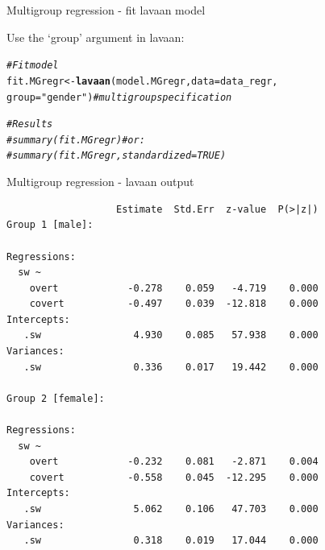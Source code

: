 \documentclass[10pt]{beamer}\usepackage[]{graphicx}\usepackage[]{xcolor}
\makeatletter
\newcommand{\hlstr}[1]{\textcolor[rgb]{0.192,0.494,0.8}{#1}}%
\newcommand{\hlcom}[1]{\textcolor[rgb]{0.678,0.584,0.686}{\textit{#1}}}%
\newcommand{\hlstd}[1]{\textcolor[rgb]{0.345,0.345,0.345}{#1}}%
\newcommand{\hlkwb}[1]{\textcolor[rgb]{0.69,0.353,0.396}{#1}}%
\newcommand{\hlkwc}[1]{\textcolor[rgb]{0.333,0.667,0.333}{#1}}%
\newcommand{\hlkwd}[1]{\textcolor[rgb]{0.737,0.353,0.396}{\textbf{#1}}}%
\newenvironment{kframe}{%
 \def\at@end@of@kframe{}%
 \ifinner\ifhmode%
  \def\at@end@of@kframe{\end{minipage}}%
  \begin{minipage}{\columnwidth}%
 \fi\fi%
 \def\FrameCommand##1{\hskip\@totalleftmargin \hskip-\fboxsep
 \colorbox{shadecolor}{##1}\hskip-\fboxsep
     \hskip-\linewidth \hskip-\@totalleftmargin \hskip\columnwidth}%
 \MakeFramed {\advance\hsize-\width
   \@totalleftmargin\z@ \linewidth\hsize
   \@setminipage}}%
 {\par\unskip\endMakeFramed%
 \at@end@of@kframe}
\newenvironment{knitrout}{}{} %
\makeatother
\begin{document}
%
\begin{frame}[fragile]{Multigroup regression - fit lavaan model}

Use the `group' argument in lavaan:

\vspace{5mm}

\begin{knitrout}
\color{fgcolor}\begin{kframe}
\begin{alltt}
\hlcom{# Fit model}
\hlstd{fit.MGregr} \hlkwb{<-} \hlkwd{lavaan}\hlstd{(model.MGregr,} \hlkwc{data} \hlstd{= data_regr,}
              \hlkwc{group} \hlstd{=} \hlstr{"gender"}\hlstd{)} \hlcom{# multigroup specification}
\end{alltt}


{\ttfamily\noindent\color{warningcolor}{\#\# Warning in lav\_data\_full(data = data, group = group, cluster = cluster, : lavaan WARNING: group variable 'gender' contains missing values}}\begin{alltt}
\hlcom{# Results}
\hlcom{#summary(fit.MGregr) # or:}
\hlcom{#summary(fit.MGregr, standardized = TRUE)}
\end{alltt}
\end{kframe}
\end{knitrout}
          
\end{frame}
%
\begin{frame}[fragile]{Multigroup regression - lavaan output}

\footnotesize{
\begin{verbatim}
                   Estimate  Std.Err  z-value  P(>|z|)
Group 1 [male]:

Regressions:
  sw ~                                                
    overt            -0.278    0.059   -4.719    0.000
    covert           -0.497    0.039  -12.818    0.000
Intercepts:
   .sw                4.930    0.085   57.938    0.000
Variances:
   .sw                0.336    0.017   19.442    0.000

Group 2 [female]:

Regressions:
  sw ~                                                
    overt            -0.232    0.081   -2.871    0.004
    covert           -0.558    0.045  -12.295    0.000
Intercepts:
   .sw                5.062    0.106   47.703    0.000
Variances:
   .sw                0.318    0.019   17.044    0.000
\end{verbatim}    
}
\end{frame}
\end{document}

